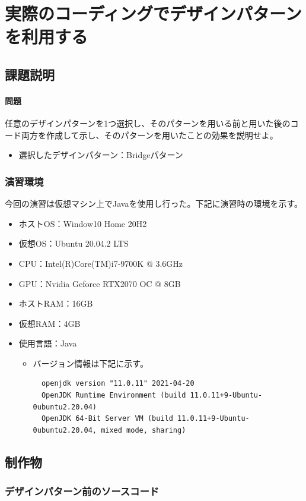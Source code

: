 \documentclass[dvipdfmx]{jsarticle}
\begin{document}
\section{実際のコーディングでデザインパターンを利用する}
\subsection{課題説明}
\paragraph{問題} 任意のデザインパターンを1つ選択し、そのパターンを用いる前と用いた後のコード両方を作成して示し、そのパターンを用いたことの効果を説明せよ。
\begin{itemize}
  \item 選択したデザインパターン：Bridgeパターン
\end{itemize}

\subsubsection{演習環境}
今回の演習は仮想マシン上でJavaを使用し行った。下記に演習時の環境を示す。
\begin{itemize}
  \item ホストOS：Window10 Home 20H2
  \item 仮想OS：Ubuntu 20.04.2 LTS
  \item CPU：Intel(R)Core(TM)i7-9700K @ 3.6GHz
  \item GPU：Nvidia Geforce RTX2070 OC @ 8GB
  \item ホストRAM：16GB
  \item 仮想RAM：4GB
  \item 使用言語：Java
  \begin{itemize}
    \item バージョン情報は下記に示す。
    \begin{verbatim}
  openjdk version "11.0.11" 2021-04-20
  OpenJDK Runtime Environment (build 11.0.11+9-Ubuntu-0ubuntu2.20.04)
  OpenJDK 64-Bit Server VM (build 11.0.11+9-Ubuntu-0ubuntu2.20.04, mixed mode, sharing)
    \end{verbatim}
  \end{itemize}
\end{itemize}

\subsection{制作物}
\subsubsection{デザインパターン前のソースコード}
\end{document}
